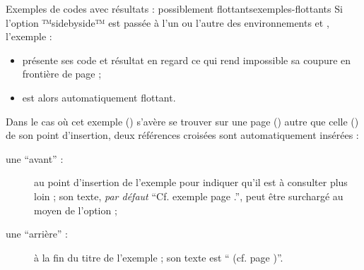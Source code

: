 \documentclass{letgut}
\begin{document}
\begin{dbwarning}{Exemples de codes avec résultats : possiblement
    flottants}{exemples-flottants}
  Si l'option ™sidebyside™ est passée à l'un ou l'autre des
  environnements  et ,
  l'exemple :
  \begin{itemize}
  \item présente ses code et résultat en regard ce qui rend impossible sa
    coupure en frontière de page ;
  \item est alors automatiquement flottant.
  \end{itemize}
  Dans le cas où cet exemple (\no{}) s'avère se trouver sur une page
  () autre que celle () de son point d'insertion, deux
  références croisées sont automatiquement insérées :
  \begin{description}
  \item[une \enquote{avant} :] au point d'insertion de l'exemple pour indiquer
    qu'il est à consulter plus loin ; son texte, \emph{par défaut}
    \enquote{Cf. exemple  page .}, peut être surchargé au moyen
    de l'option  ;
  \item[une \enquote{arrière} :] à la fin du titre de l'exemple ; son texte est
    \enquote{ (cf. page )}.
  \end{description}
\end{dbwarning}
\end{document}
